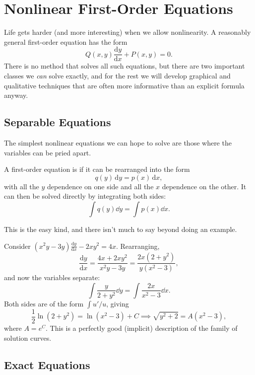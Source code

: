 \section{Nonlinear First-Order Equations}

Life gets harder (and more interesting) when we allow nonlinearity. A reasonably general first-order equation has the form
$$
Q(x, y) \frac{\mathrm{d}y}{\mathrm{d}x} + P(x, y) = 0.
$$
There is no method that solves all such equations, but there are two important classes we \emph{can} solve exactly, and for the rest we will develop graphical and qualitative techniques that are often more informative than an explicit formula anyway.

\subsection{Separable Equations}

The simplest nonlinear equations we can hope to solve are those where the variables can be pried apart.

\begin{definition}
	A first-order equation is  if it can be rearranged into the form
	$$
	q(y) \, \mathrm{d}y = p(x) \, \mathrm{d}x,
	$$
	with all the $y$ dependence on one side and all the $x$ dependence on the other. It can then be solved directly by integrating both sides:
	$$
	\int q(y) \dd y = \int p(x) \dd x.
	$$
\end{definition}

This is the easy kind, and there isn't much to say beyond doing an example.

\begin{example}
	Consider $(x^2 y - 3y) \frac{\mathrm{d}y}{\mathrm{d}x} - 2xy^2 = 4x$. Rearranging,
	$$
	\frac{\mathrm{d}y}{\mathrm{d}x} = \frac{4x + 2xy^2}{x^2 y - 3y} = \frac{2x (2 + y^2)}{y (x^2 - 3)},
	$$
	and now the variables separate:
	$$
	\int \frac{y}{2 + y^2} \dd y = \int \frac{2x}{x^2 - 3} \dd x.
	$$
	Both sides are of the form $\int u'/u$, giving
	$$
	\frac{1}{2}\ln (2 + y^2) = \ln (x^2 - 3) + C \implies \sqrt{y^2 + 2} = A(x^2 - 3),
	$$
	where $A = e^C$. This is a perfectly good (implicit) description of the family of solution curves.
\end{example}

\subsection{Exact Equations}


